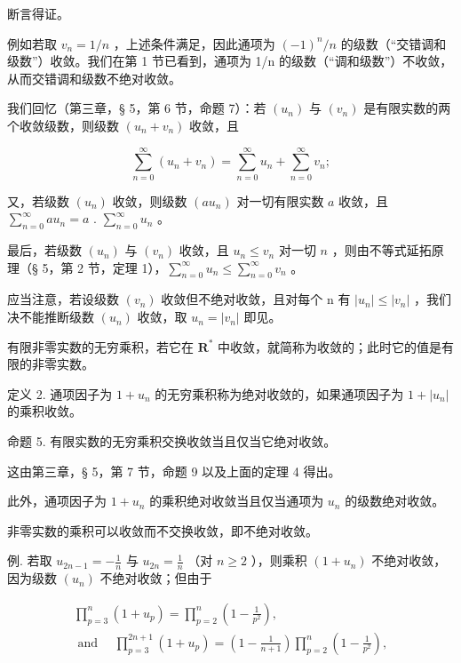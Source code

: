 断言得证。

例如若取 \(v_{n}=1/n\) ，上述条件满足，因此通项为 \((-1)^{n}/n\) 的级数（``交错调和级数''）收敛。我们在第 1 节已看到，通项为 1/n 的级数（``调和级数''）不收敛，从而交错调和级数不绝对收敛。

我们回忆（第三章，§ 5，第 6 节，命题 7）：若 \((u_n)\) 与 \((v_n)\) 是有限实数的两个收敛级数，则级数 \((u_n + v_n)\) 收敛，且

\[
\sum_ {n = 0} ^ {\infty} \left(u _ {n} + v _ {n}\right) = \sum_ {n = 0} ^ {\infty} u _ {n} + \sum_ {n = 0} ^ {\infty} v _ {n};
\]

又，若级数 \((u_{n})\) 收敛，则级数 \((au_{n})\) 对一切有限实数 \(a\) 收敛，且 \(\sum_{n=0}^{\infty} au_{n} = a\) . \(\sum_{n=0}^{\infty} u_{n}\) 。

最后，若级数 \((u_n)\) 与 \((v_n)\) 收敛，且 \(u_n \leqslant v_n\) 对一切 \(n\) ，则由不等式延拓原理（§ 5，第 2 节，定理 1），\(\sum_{n=0}^{\infty} u_n \leqslant \sum_{n=0}^{\infty} v_n\) 。

应当注意，若设级数 \((v_{n})\) 收敛但不绝对收敛，且对每个 n 有 \(|u_{n}| \leqslant |v_{n}|\) ，我们决不能推断级数 \((u_{n})\) 收敛，取 \(u_{n} = |v_{n}|\) 即见。

有限非零实数的无穷乘积，若它在 \(\mathbf{R}^*\) 中收敛，就简称为收敛的；此时它的值是有限的非零实数。

定义 2. 通项因子为 \(1 + u_{n}\) 的无穷乘积称为绝对收敛的，如果通项因子为 \(1 + |u_{n}|\) 的乘积收敛。

命题 5. 有限实数的无穷乘积交换收敛当且仅当它绝对收敛。

这由第三章，§ 5，第 7 节，命题 9 以及上面的定理 4 得出。

此外，通项因子为 \(1 + u_{n}\) 的乘积绝对收敛当且仅当通项为 \(u_{n}\) 的级数绝对收敛。

非零实数的乘积可以收敛而不交换收敛，即不绝对收敛。

例. 若取 \(u_{2n-1} = -\frac{1}{n}\) 与 \(u_{2n} = \frac{1}{n}\) （对 \(n \geqslant 2\) ），则乘积 \((1 + u_n)\) 不绝对收敛，因为级数 \((u_n)\) 不绝对收敛；但由于

\[
\begin{array}{l} \prod_ {p = 3} ^ {n} (1 + u _ {p}) = \prod_ {p = 2} ^ {n} \left(1 - \frac {1}{p ^ {2}}\right), \\ \text { and } \quad \prod_ {p = 3} ^ {2 n + 1} (1 + u _ {p}) = \left(1 - \frac {1}{n + 1}\right) \prod_ {p = 2} ^ {n} \left(1 - \frac {1}{p ^ {2}}\right), \end{array}
\]

